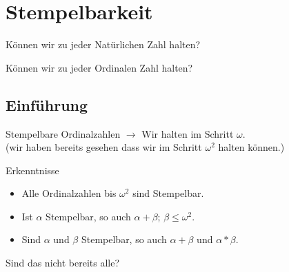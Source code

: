 \section{Stempelbarkeit}


\begin{frame}[standout]
    \huge
    Können wir zu jeder Natürlichen Zahl halten?
\end{frame}


\begin{frame}[standout]
    \huge
    Können wir zu jeder Ordinalen Zahl halten?
\end{frame}



\subsection{Einführung}

\begin{frame}[c]{Stempelbare Ordinalzahlen}
    \pause
    \pause
    $\rightarrow$ Wir halten im Schritt $\omega$. \\ \pause
    \small
    (wir haben bereits gesehen dass wir im Schritt $\omega^2$ halten können.)
\end{frame}

\begin{frame}[c]{Erkenntnisse}
    \Large
    \begin{itemize}
        \item Alle Ordinalzahlen bis $\omega^2$ sind Stempelbar.
            \pause
        \item Ist $\alpha$ Stempelbar, so auch $\alpha + \beta$; $\beta \leq \omega^2$.
            \pause
        \item Sind $\alpha$ und $\beta$ Stempelbar, so auch $\alpha + \beta$ \pause und $\alpha * \beta$.
    \end{itemize}
    \pause
    Sind das nicht bereits alle?
\end{frame}


